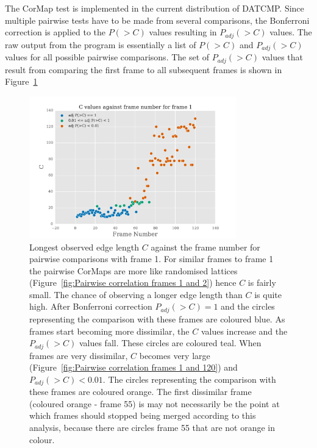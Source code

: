 The CorMap test is implemented in the current distribution of DATCMP.
Since multiple pairwise tests have to be made from several comparisons, the Bonferroni correction is applied to the $P(>C)$ values resulting in $P_{adj}(>C)$ values.
The raw output from the program is essentially a list of $P(>C)$ and $P_{adj}(>C)$ values for all possible pairwise comparisons.
The set of $P_{adj}(>C)$ values that result from comparing the first frame to all subsequent frames is shown in Figure~\ref{fig:p values for comparisons with frame 1}
\begin{figure}
    \centering
    \includegraphics[width=0.8\textwidth]{figures/saxs/scatter_asc_10.pdf}
    \caption{Longest observed edge length $C$ against the frame number for pairwise comparisons with frame 1.
    For similar frames to frame 1 the pairwise CorMaps are more like randomised lattices (Figure~\ref{fig:Pairwise correlation frames 1 and 2}) hence $C$ is fairly small.
    The chance of observing a longer edge length than $C$ is quite high.
    After Bonferroni correction $P_{adj}(>C) = 1$ and the circles representing the comparison with these frames are coloured blue.
    As frames start becoming more dissimilar, the $C$ values increase and the $P_{adj}(>C)$ values fall.
    These circles are coloured teal.
    When frames are very dissimilar, $C$ becomes very large (Figure~\ref{fig:Pairwise correlation frames 1 and 120}) and $P_{adj}(>C) < 0.01$.
    The circles representing the comparison with these frames are coloured orange.
    The first dissimilar frame (coloured orange - frame 55) is may not necessarily be the point at which frames should stopped being merged according to this analysis, because there are circles frame 55 that are not orange in colour.}
    \label{fig:p values for comparisons with frame 1}
\end{figure}

